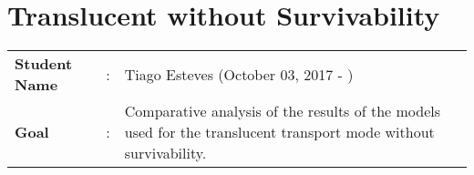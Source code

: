 \clearpage

\section{Translucent without Survivability}\label{comparative_Transluc_Survivability}
\begin{tcolorbox}	
\begin{tabular}{p{2.75cm} p{0.2cm} p{10.5cm}} 	
\textbf{Student Name}  &:& Tiago Esteves    (October 03, 2017 - )\\
\textbf{Goal}          &:& Comparative analysis of the results of the models used for the translucent transport mode without survivability.
\end{tabular}
\end{tcolorbox}
\vspace{11pt}

